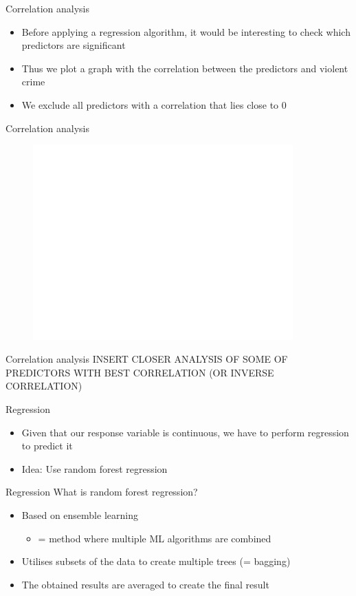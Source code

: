 \documentclass{beamer}
\begin{document}
	\begin{frame}{Correlation analysis}
		\begin{itemize}
			\item Before applying a regression algorithm, it would be interesting to check which predictors are significant
			\item Thus we plot a graph with the correlation between the predictors and violent crime
			\item We exclude all predictors with a correlation that lies close to $0$
		\end{itemize}
	\end{frame}
	\begin{frame}{Correlation analysis}
		\begin{figure}[h]
			\includegraphics[width=10cm]{correlation.png}
			\centering
		\end{figure}
	\end{frame}
	\begin{frame}{Correlation analysis}
		INSERT CLOSER ANALYSIS OF SOME OF PREDICTORS WITH BEST CORRELATION (OR INVERSE CORRELATION)
	\end{frame}
	\begin{frame}{Regression}
		\begin{itemize}
			\item Given that our response variable is continuous, we have to perform regression to predict it
			\item Idea: Use random forest regression
		\end{itemize}
	\end{frame}
	\begin{frame}{Regression}
		What is random forest regression?
		\begin{itemize}
			\item Based on ensemble learning
			\begin{itemize}
				\item = method where multiple ML algorithms are combined
			\end{itemize}
			\item Utilises subsets of the data to create multiple trees (= bagging)
			\item The obtained results are averaged to create the final result
		\end{itemize}
	\end{frame}
\end{document}
